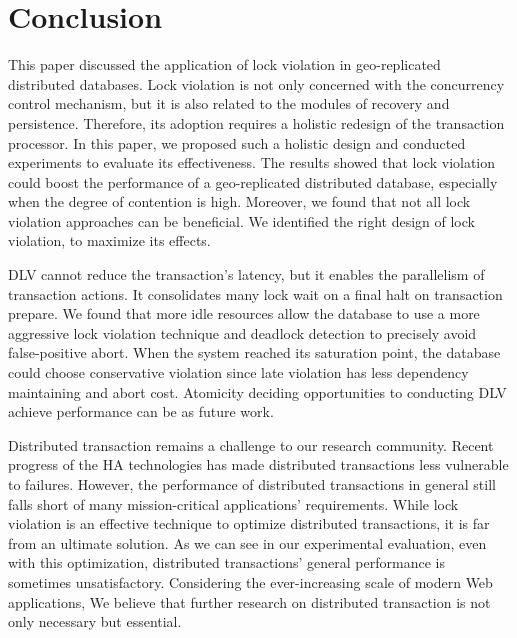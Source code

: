 \documentclass[conference]{IEEEtran}
\begin{document}
\section{Conclusion}
\label{sec:conclusion}

This paper discussed the application of lock violation in geo-replicated distributed databases.
Lock violation is not only concerned with the concurrency control mechanism, but it is also related to the modules of recovery and persistence.
Therefore, its adoption requires a holistic redesign of the transaction processor.
In this paper, we proposed such a holistic design and conducted experiments to evaluate its effectiveness.
The results showed that lock violation could boost the performance of a geo-replicated distributed database, especially when the degree of contention is high.
Moreover, we found that not all lock violation approaches can be beneficial. We identified the right design of lock violation, to maximize its effects.

DLV cannot reduce the transaction's latency, but it enables the parallelism of transaction actions.
It consolidates many lock wait on a final halt on transaction prepare.
We found that more idle resources allow the database to use a more aggressive lock violation technique and deadlock detection to precisely avoid false-positive abort.
When the system reached its saturation point, the database could choose 
conservative violation since late violation has less dependency maintaining and abort cost.
Atomicity deciding opportunities to conducting DLV achieve performance can be as future work.


Distributed transaction remains a challenge to our research community. Recent progress of the HA technologies has made distributed transactions less vulnerable to failures.
However, the performance of distributed transactions in general still falls short of many mission-critical applications' requirements.
While lock violation is an effective technique to optimize distributed transactions, it is far from an ultimate solution.
As we can see in our experimental evaluation, even with this optimization, distributed transactions' general performance is sometimes unsatisfactory.
Considering the ever-increasing scale of modern Web applications, We believe that further research on distributed transaction is not only necessary but essential.





\end{document}
